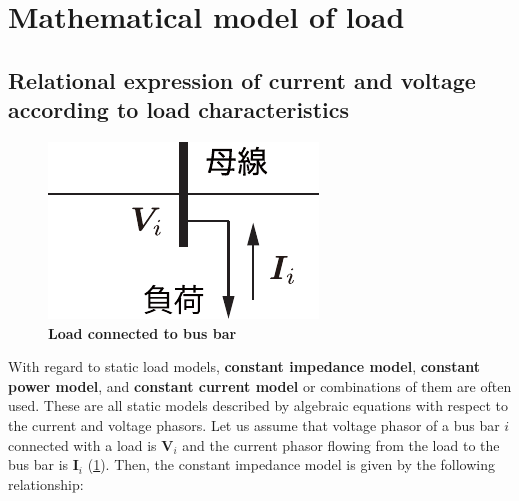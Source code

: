 \documentclass[graybox, envcountchap]{svmult}
\begin{document}
\section{Mathematical model of load}\label{sec:modload}

\subsection{Relational expression of current and voltage according to load
characteristics}\label{sec:loadpr}

\begin{figure}[t]
  \centering
  \includegraphics[width = .25\linewidth]{figs/loadbus}
  \medskip
  \caption{\textbf{Load connected to bus bar}}
  \label{fig:loadbus}
  \medskip
\end{figure}

With regard to static load models, \textbf{constant impedance model},
\textbf{constant power model}, and \textbf{constant current model} or
combinations of them are often used. These are all static models described by
algebraic equations with respect to the current and voltage phasors. Let us
assume that voltage phasor of a bus bar $i$ connected with a load is $\bm{V}_i$
and the current phasor flowing from the load to the bus bar is $\bm{I}_i$
(\ref{fig:loadbus}). Then, the constant impedance model is given by the
following relationship:
\end{document}
